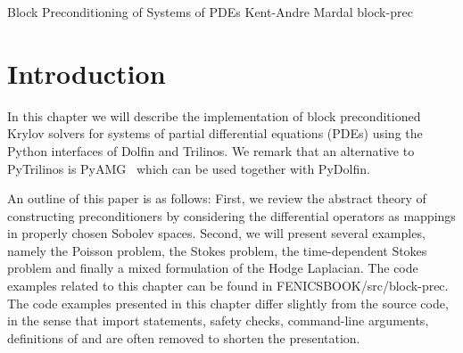

              {Block Preconditioning of Systems of PDEs}
              {Kent-Andre Mardal}
              {block-prec}
%



\section{Introduction}

In this chapter we will describe the implementation of block preconditioned
Krylov solvers for systems of partial differential equations (PDEs) using
the Python interfaces of Dolfin and Trilinos. We remark that
an alternative to PyTrilinos is PyAMG~\cite{pyamg} which can be used together with PyDolfin. 

An outline of this paper is as follows: First, we review the
abstract theory of constructing preconditioners by considering the
differential operators as mappings in properly chosen Sobolev spaces. 
Second, we will
present several examples, namely the Poisson problem, the Stokes problem, 
the time-dependent Stokes problem and finally a mixed formulation
of the Hodge Laplacian. The code examples related to this chapter can
be found in FENICSBOOK/src/block-prec. 
The code examples presented in this chapter differ slightly from the source
code, in the sense that import statements,  safety checks, command-line arguments, definitions of 
and  are often removed to shorten the presentation. 

